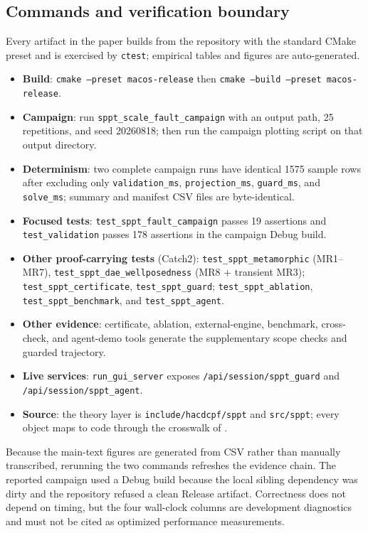 \documentclass[preprint,12pt,a4paper]{elsarticle}
\newcommand{\code}[1]{\texttt{#1}}
\begin{document}
\subsection{Commands and verification boundary}

Every artifact in the paper builds from the repository with the standard CMake
preset and is exercised by \code{ctest}; empirical tables and figures are
auto-generated.
\begin{itemize}[leftmargin=1.5em]
  \item \textbf{Build}: \code{cmake --preset macos-release} then
  \code{cmake --build --preset macos-release}.
  \item \textbf{Campaign}: run \code{sppt\_scale\_fault\_campaign} with an
  output path, 25 repetitions, and seed 20260818; then run the campaign plotting
  script on that output directory.
  \item \textbf{Determinism}: two complete campaign runs have identical 1575
  sample rows after excluding only \code{validation\_ms},
  \code{projection\_ms}, \code{guard\_ms}, and \code{solve\_ms}; summary and
  manifest CSV files are byte-identical.
  \item \textbf{Focused tests}: \code{test\_sppt\_fault\_campaign} passes 19
  assertions and \code{test\_validation} passes 178 assertions in the campaign
  Debug build.
  \item \textbf{Other proof-carrying tests} (Catch2):
  \nolinkurl{test_sppt_metamorphic} (MR1--MR7),
  \nolinkurl{test_sppt_dae_wellposedness} (MR8 $+$ transient MR3);\hfill\break
  \nolinkurl{test_sppt_certificate}, \nolinkurl{test_sppt_guard};\hfill\break
  \nolinkurl{test_sppt_ablation}, \nolinkurl{test_sppt_benchmark}, and
  \nolinkurl{test_sppt_agent}.
  \item \textbf{Other evidence}: certificate, ablation, external-engine,
  benchmark, cross-check, and agent-demo tools generate the supplementary scope
  checks and guarded trajectory.
  \item \textbf{Live services}: \nolinkurl{run_gui_server} exposes
  \nolinkurl{/api/session/sppt_guard} and \nolinkurl{/api/session/sppt_agent}.
  \item \textbf{Source}: the theory layer is \nolinkurl{include/hacdcpf/sppt} and
  \nolinkurl{src/sppt}; every object maps to code through the crosswalk of
  .
\end{itemize}
Because the main-text figures are generated from CSV rather than manually
transcribed, rerunning the two commands refreshes the evidence chain. The
reported campaign used a Debug build because the local sibling dependency was
dirty and the repository refused a clean Release artifact. Correctness does not
depend on timing, but the four wall-clock columns are development diagnostics and
must not be cited as optimized performance measurements.
\end{document}
